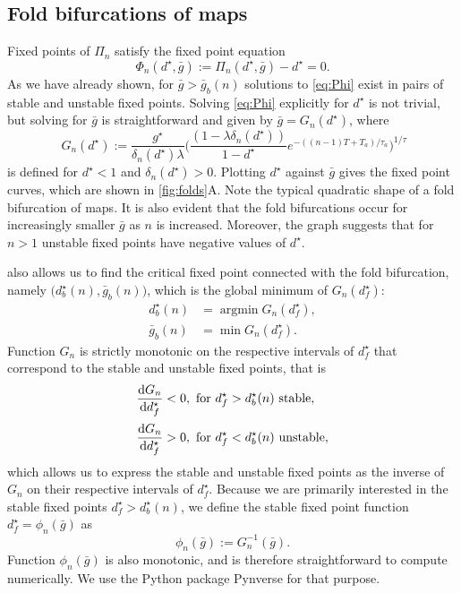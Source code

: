 \subsection{Fold bifurcations of maps}
Fixed points of $\Pi_n$ satisfy the fixed point equation
\begin{equation}
	\label{eq:Phi}
	\Phi_{n}(d^{\star}, \bar g) := \Pi_{n}(d^{\star}, \bar g)-d^{\star} = 0.
\end{equation}
As we have already shown, for $\bar g > \bar g_b(n)$ solutions to \cref{eq:Phi} exist in pairs of stable and unstable fixed points.
Solving \cref{eq:Phi} explicitly for $d^{\star}$ is not trivial, but solving for $\bar g$ is straightforward and given by $\bar g= G_n(d^\star)$, where
\begin{equation}
	~\label{eq:g}
	G_{n}(d^{\star}) :=
	\frac{g^{\star}}{\delta_n(d^\star)\lambda}
	\Big(
	\frac{(1-\lambda\delta_n(d^\star)) }{1-d^\star} e^{-((n-1)T + T_{a})/\tau_a}
	\Big)^{1/\tau}
\end{equation}
is defined for $d^{\star}<1$ and $\delta_{n}(d^{\star})>0$.
Plotting $d^\star$ against $\bar g$ gives the fixed point curves, which are shown in \cref{fig:folds}A.
Note the typical quadratic shape of a fold bifurcation of maps.
It is also evident that the fold bifurcations occur for increasingly smaller $\bar g$ as $n$ is increased.
Moreover, the graph suggests that for $n>1$ unstable fixed points have negative values of $d^\star$.

 also allows us to find the critical fixed point connected with the fold bifurcation, namely $\big(d^\star_b(n), \bar g_b(n)\big)$, which is the global minimum
of $G_n(d^\star_f)$:
\begin{align}
	d^\star_b(n) & = \operatorname{argmin} G_n(d^\star_f), \\
	\bar g_b(n)  & = \min{G_n(d^\star_f)}.
\end{align}
Function $G_n$ is strictly monotonic on the respective intervals of $d^\star_f$ that correspond to the stable and unstable fixed points, that is
\begin{align}
	\dv{G_n}{d^\star_f} & < 0, \text{ for } d^\star_f>d^\star_b(n) \text{ stable},   \\[0.5ex]
	\dv{G_n}{d^\star_f} & > 0, \text{ for } d^\star_f<d^\star_b(n) \text{ unstable},
\end{align}
which allows us to express the stable and unstable fixed points as the inverse of $G_n$ on their respective intervals of $d^\star_f$.
Because we are primarily interested in the stable fixed points $d^\star_f>d^\star_b(n)$, we define the stable fixed point function $d^\star_f = \phi_n(\bar g)$ as
\begin{equation}
	\label{eq:phi}
	\phi_n(\bar g):= G_n^{-1}(\bar g).
\end{equation}
Function $\phi_n(\bar g)$ is also monotonic, and is therefore straightforward to compute numerically.
We use the Python package Pynverse \citep{pynverse} for that purpose.

